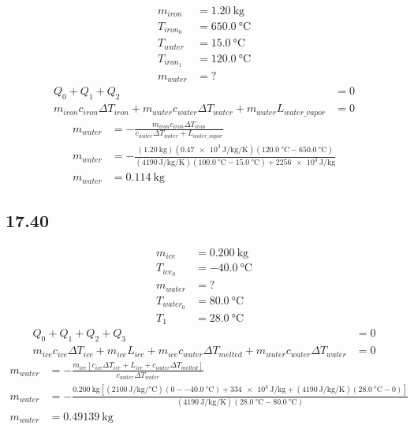 \documentclass{article}
\begin{document}
\begin{align*}
	m_{iron} & = \SI{1.20}{\kilogram} \\
	T_{iron_0} & = \SI{650.0}{\celsius} \\
	T_{water} & = \SI{15.0}{\celsius} \\
	T_{iron_1} & = \SI{120.0}{\celsius} \\
	m_{water} & = ?
\end{align*}
\begin{align*}
	Q_0 + Q_1 + Q_2 & = 0 \\
	m_{iron}c_{iron}\Delta T_{iron} + m_{water}c_{water}\Delta T_{water} + m_{water}L_{water\_vapor} & = 0
\end{align*}
\begin{align*}
	m_{water} & = - \frac{ m_{iron}c_{iron}\Delta T_{iron} }{ c_{water}\Delta T_{water} + L_{water\_vapor} } \\
	m_{water} & = - \frac{ (\SI{1.20}{\kilogram})(\SI{0.47e3}{\joule \per \kilogram \per \kelvin})(\SI{120.0}{\celsius} - \SI{650.0}{\celsius}) }{ (\SI{4190}{\joule \per \kilogram \per \kelvin})(\SI{100.0}{\celsius} - \SI{15.0}{\celsius}) + \SI{2256e3}{\joule \per \kilogram} } \\
	m_{water} & = \SI{0.114}{\kilogram}
\end{align*}

\subsection{17.40}

\begin{align*}
	m_{ice} & = \SI{0.200}{\kilogram} \\
	T_{ice_0} & = \SI{-40.0}{\celsius} \\
	m_{water} & = ? \\
	T_{water_0} & = \SI{80.0}{\celsius} \\
	T_1 & = \SI{28.0}{\celsius}
\end{align*}
\begin{align*}
	Q_0 + Q_1 + Q_2 + Q_3 & = 0 \\
	m_{ice}c_{ice}\Delta T_{ice} + m_{ice}L_{ice} + m_{ice}c_{water}\Delta T_{melted} + m_{water}c_{water}\Delta T_{water} & = 0
\end{align*}
\begin{align*}
	m_{water} & = - \frac{ m_{ice} \left[ c_{ice}\Delta T_{ice} + L_{ice} + c_{water}\Delta T_{melted} \right] }{ c_{water}\Delta T_{water} } \\
	m_{water} & = - \frac{ \SI{0.200}{\kilogram} \left[ (\SI{2100}{\joule \per \kilogram \per \celsius})(0 - \SI{-40.0}{\celsius}) + \SI{334e3}{\joule \per \kilogram} + (\SI{4190}{\joule \per \kilogram \per \kelvin})(\SI{28.0}{\celsius} - 0) \right] }{ (\SI{4190}{\joule \per \kilogram \per \kelvin})(\SI{28.0}{\celsius} - \SI{80.0}{\celsius}) } \\
	m_{water} & = \SI{0.49139}{\kilogram}
\end{align*}
\end{document}
